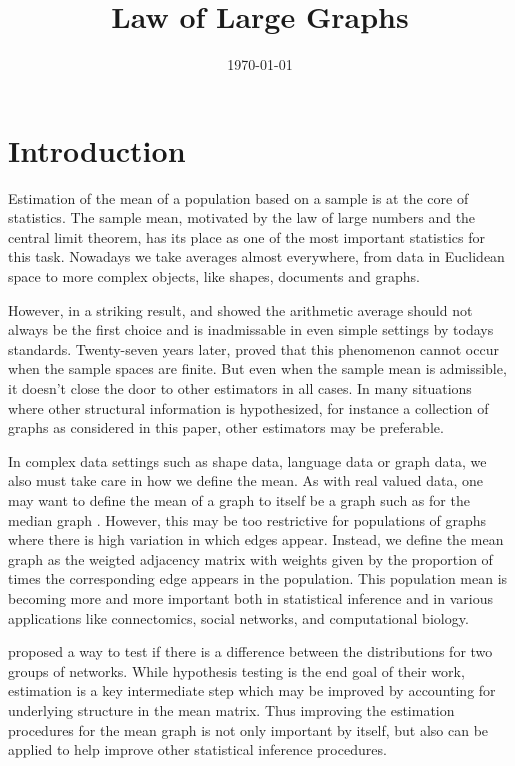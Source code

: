 \documentclass[a4paper]{article}
\title{Law of Large Graphs}
\date{\today}
\begin{document}
\maketitle

\section{Introduction}

Estimation of the mean of a population based on a sample is at the core of statistics.
The sample mean, motivated by the law of large numbers and the central limit theorem, has its place as one of the most important statistics for this task.
Nowadays we take averages almost everywhere, from data in Euclidean space to more complex objects, like shapes, documents and graphs.

However, in a striking result, \citet{stein1956inadmissibility} and \citet{james1961estimation} showed the arithmetic average should not always be the first choice and is inadmissable in even simple settings by todays standards. 
Twenty-seven years later, \citet{gutmann1982stein} proved that this phenomenon cannot occur when the sample spaces are finite.
But even when  the sample mean is admissible, it doesn't close the door to other estimators in all cases.
In many situations where other structural information is hypothesized, for instance a collection of graphs as considered in this paper, other estimators may be preferable.

In complex data settings such as shape data, language data or graph data, we also must take care in how we define the mean.
As with real valued data, one may want to define the mean of a graph to itself be a graph such as for the median graph \citep{jiang2001median}.
However, this may be too restrictive for populations of graphs where there is high variation in which edges appear. 
Instead, we define the mean graph as the weigted adjacency matrix with weights given by the proportion of times the corresponding edge appears in the population. 
This population mean is becoming more and more important both in statistical inference and in various applications like connectomics, social networks, and computational biology.

\citet{ginestet2014hypothesis} proposed a way to test if there is a difference between the distributions for two groups of networks.  
While hypothesis testing is the end goal of their work, estimation is a key intermediate step which may be improved by accounting for underlying structure in the mean matrix. 
Thus improving the estimation procedures for the mean graph is not only important by itself, but also can be applied to help improve other statistical inference procedures.
\end{document}
